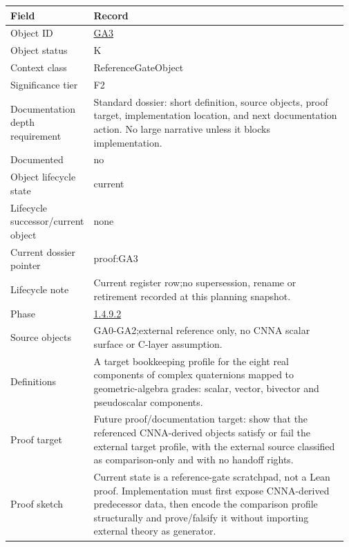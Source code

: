 \begin{longtable}{L{0.16\linewidth} L{0.81\linewidth}}
\hline
\textbf{Field} & \textbf{Record}\\
\hline
Object ID & \hyperlink{object-row-GA3}{GA3}\\
\hline\addlinespace[0.20em]
Object status & K\\
\hline\addlinespace[0.20em]
Context class & ReferenceGateObject\\
\hline\addlinespace[0.20em]
Significance tier & F2\\
\hline\addlinespace[0.20em]
Documentation depth requirement & Standard dossier: short definition, source objects, proof target, implementation location, and next documentation action. No large narrative unless it blocks implementation.\\
\hline\addlinespace[0.20em]
Documented & no\\
\hline\addlinespace[0.20em]
Object lifecycle state & current\\
\hline\addlinespace[0.20em]
Lifecycle successor/\allowbreak{}current object & none\\
\hline\addlinespace[0.20em]
Current dossier pointer & proof:GA3\\
\hline\addlinespace[0.20em]
Lifecycle note & Current register row;\newline no supersession, rename or retirement recorded at this planning snapshot.\\
\hline\addlinespace[0.20em]
Phase & \hyperlink{phase-row-1-4-9-2}{1.4.9.2}\\
\hline\addlinespace[0.20em]
Source objects & GA0-GA2;\newline external reference only, no CNNA scalar surface or C-layer assumption.\\
\hline\addlinespace[0.20em]
Definitions & A target bookkeeping profile for the eight real components of complex quaternions mapped to geometric-algebra grades: scalar, vector, bivector and pseudoscalar components.\\
\hline\addlinespace[0.20em]
Proof target & Future proof/\allowbreak{}documentation target: show that the referenced CNNA-derived objects satisfy or fail the external target profile, with the external source classified as comparison-only and with no handoff rights.\\
\hline\addlinespace[0.20em]
Proof sketch & Current state is a reference-gate scratchpad, not a Lean proof. Implementation must first expose CNNA-derived predecessor data, then encode the comparison profile structurally and prove/\allowbreak{}falsify it without importing external theory as generator.\\

\end{longtable}
